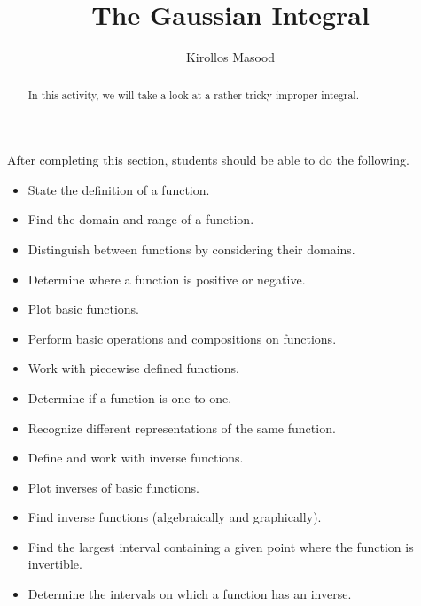 \documentclass{ximera}
\title{The Gaussian Integral}
\author{Kirollos Masood}
\begin{document}
\begin{abstract}
In this activity, we will take a look at a rather tricky improper integral.
\end{abstract}
\maketitle

\begin{sectionOutcomes}
	After completing this section, students should be able to do the following.
	
	\begin{itemize}
		\item State the definition of a function.
		\item Find the domain and range of a function.
		\item Distinguish between functions by considering their domains.
		\item Determine where a function is positive or negative.
		\item Plot basic functions.
		\item Perform basic operations and compositions on
		functions.
		\item Work with piecewise defined functions.
		\item Determine if a function is one-to-one.
		\item Recognize different representations of the same function.
		\item Define and work with inverse functions.
		\item Plot inverses of basic functions.
		\item Find inverse functions (algebraically and graphically).
		\item Find the largest interval containing a given point
		where the function is invertible.
		\item Determine the intervals on which a function has an inverse.
		
	\end{itemize}
\end{sectionOutcomes}
\end{document}
